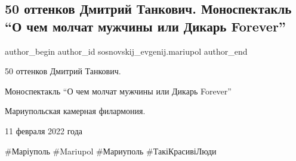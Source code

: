  
 
 
 
 

\subsection{50 оттенков Дмитрий Танкович. Моноспектакль \enquote{О чем молчат мужчины или Дикарь Forever}}
\label{sec:12_02_2022.fb.sosnovskij_evgenij.mariupol.1.50_ottenkov_dmitrij_tankovich}

\ifcmt
 author_begin
   author_id sosnovskij_evgenij.mariupol
 author_end
\fi

50 оттенков Дмитрий Танкович.

Моноспектакль \enquote{О чем молчат мужчины или Дикарь Forever}

Мариупольская камерная филармония.

11 февраля 2022 года

\#Маріуполь \#Mariupol \#Мариуполь \#ТакіКрасивіЛюди
